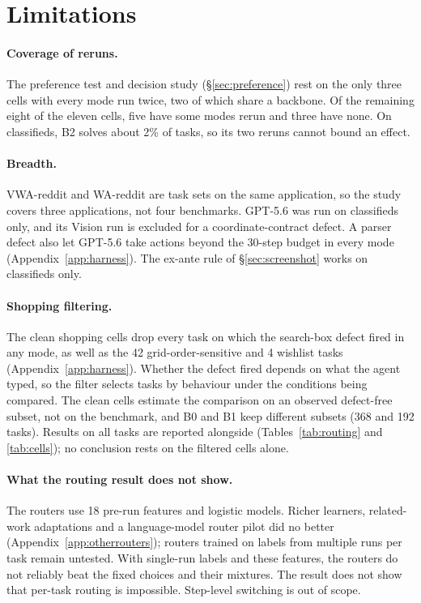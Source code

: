 \section*{Limitations}

\paragraph{Coverage of reruns.} The preference test and decision study (\S\ref{sec:preference}) rest on the only three cells with every mode run twice, two of which share a backbone. Of the remaining eight of the eleven cells, five have some modes rerun and three have none. On classifieds, B2 solves about 2\% of tasks, so its two reruns cannot bound an effect.

\paragraph{Breadth.} VWA-reddit and WA-reddit are task sets on the same application, so the study covers three applications, not four benchmarks. GPT-5.6 was run on classifieds only, and its Vision run is excluded for a coordinate-contract defect. A parser defect also let GPT-5.6 take actions beyond the 30-step budget in every mode (Appendix~\ref{app:harness}). The ex-ante rule of \S\ref{sec:screenshot} works on classifieds only.

\paragraph{Shopping filtering.} The clean shopping cells drop every task on which the search-box defect fired in any mode, as well as the 42 grid-order-sensitive and 4 wishlist tasks (Appendix~\ref{app:harness}). Whether the defect fired depends on what the agent typed, so the filter selects tasks by behaviour under the conditions being compared. The clean cells estimate the comparison on an observed defect-free subset, not on the benchmark, and B0 and B1 keep different subsets (368 and 192 tasks). Results on all tasks are reported alongside (Tables~\ref{tab:routing} and \ref{tab:cells}); no conclusion rests on the filtered cells alone.

\paragraph{What the routing result does not show.} The routers use 18 pre-run features and logistic models. Richer learners, related-work adaptations and a language-model router pilot did no better (Appendix~\ref{app:otherrouters}); routers trained on labels from multiple runs per task remain untested. With single-run labels and these features, the routers do not reliably beat the fixed choices and their mixtures. The result does not show that per-task routing is impossible. Step-level switching is out of scope.


